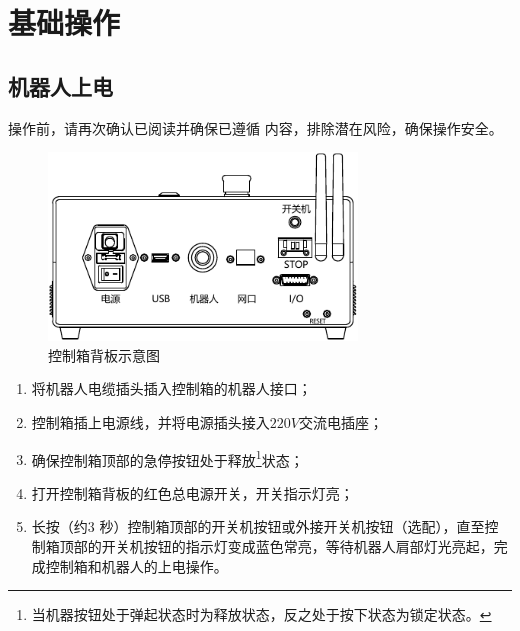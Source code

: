 \chapter{基础操作}
\label{cha:基础操作}

\section{机器人上电}

操作前，请再次确认已阅读并确保已遵循 内容，排除潜在风险，确保操作安全。

\begin{figure}[hb]
    \centering
    \includegraphics[height=5cm]{line_graphs/robot_control_box_back.pdf}
    \caption{控制箱背板示意图}
    \label{fig:控制箱背板示意图}
\end{figure}

\begin{enumerate}
\item 将机器人电缆插头插入控制箱的机器人接口；
\item 控制箱插上电源线，并将电源插头接入$220 \unit{V}$交流电插座；
\item 确保控制箱顶部的急停按钮处于释放\footnote{当机器按钮处于弹起状态时为释放状态，反之处于按下状态为锁定状态。}状态；
\item 打开控制箱背板的红色总电源开关，开关指示灯亮；
\item 长按（约3 秒）控制箱顶部的开关机按钮或外接开关机按钮（选配），直至控制箱顶部的开关机按钮的指示灯变成蓝色常亮，等待机器人肩部灯光亮起，完成控制箱和机器人的上电操作。
\end{enumerate}


